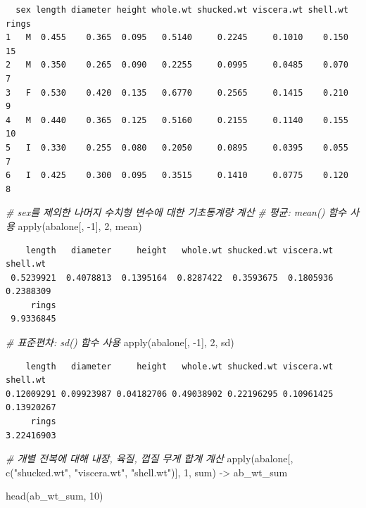 \documentclass[
  11pt,
]{krantz}
\newenvironment{Shaded}{\begin{snugshade}}{\end{snugshade}}
\newcommand{\CommentTok}[1]{\textcolor[rgb]{0.37,0.37,0.37}{\textit{#1}}}
\newcommand{\DecValTok}[1]{\textcolor[rgb]{0.06,0.06,0.06}{#1}}
\newcommand{\FunctionTok}[1]{\textcolor[rgb]{0,0,0}{#1}}
\newcommand{\NormalTok}[1]{#1}
\newcommand{\OtherTok}[1]{\textcolor[rgb]{0.37,0.37,0.37}{#1}}
\newcommand{\SpecialCharTok}[1]{\textcolor[rgb]{0,0,0}{#1}}
\newcommand{\StringTok}[1]{\textcolor[rgb]{0.5,0.5,0.5}{#1}}
\begin{document}
\begin{verbatim}
  sex length diameter height whole.wt shucked.wt viscera.wt shell.wt rings
1   M  0.455    0.365  0.095   0.5140     0.2245     0.1010    0.150    15
2   M  0.350    0.265  0.090   0.2255     0.0995     0.0485    0.070     7
3   F  0.530    0.420  0.135   0.6770     0.2565     0.1415    0.210     9
4   M  0.440    0.365  0.125   0.5160     0.2155     0.1140    0.155    10
5   I  0.330    0.255  0.080   0.2050     0.0895     0.0395    0.055     7
6   I  0.425    0.300  0.095   0.3515     0.1410     0.0775    0.120     8
\end{verbatim}

\begin{Shaded}
\begin{Highlighting}[]
\CommentTok{\# sex를 제외한 나머지 수치형 변수에 대한 기초통계량  계산}
\CommentTok{\# 평균: mean() 함수 사용}
\FunctionTok{apply}\NormalTok{(abalone[, }\SpecialCharTok{{-}}\DecValTok{1}\NormalTok{], }\DecValTok{2}\NormalTok{, mean)}
\end{Highlighting}
\end{Shaded}

\begin{verbatim}
    length   diameter     height   whole.wt shucked.wt viscera.wt   shell.wt 
 0.5239921  0.4078813  0.1395164  0.8287422  0.3593675  0.1805936  0.2388309 
     rings 
 9.9336845 
\end{verbatim}

\begin{Shaded}
\begin{Highlighting}[]
\CommentTok{\# 표준편차: sd() 함수 사용}
\FunctionTok{apply}\NormalTok{(abalone[, }\SpecialCharTok{{-}}\DecValTok{1}\NormalTok{], }\DecValTok{2}\NormalTok{, sd)}
\end{Highlighting}
\end{Shaded}

\begin{verbatim}
    length   diameter     height   whole.wt shucked.wt viscera.wt   shell.wt 
0.12009291 0.09923987 0.04182706 0.49038902 0.22196295 0.10961425 0.13920267 
     rings 
3.22416903 
\end{verbatim}

\begin{Shaded}
\begin{Highlighting}[]
\CommentTok{\# 개별 전복에 대해 내장, 육질, 껍질 무게 합계 계산}
\FunctionTok{apply}\NormalTok{(abalone[, }\FunctionTok{c}\NormalTok{(}\StringTok{"shucked.wt"}\NormalTok{, }
                  \StringTok{"viscera.wt"}\NormalTok{, }
                  \StringTok{"shell.wt"}\NormalTok{)], }\DecValTok{1}\NormalTok{, }
\NormalTok{      sum) }\OtherTok{{-}\textgreater{}}\NormalTok{ ab\_wt\_sum}

\FunctionTok{head}\NormalTok{(ab\_wt\_sum, }\DecValTok{10}\NormalTok{)}
\end{Highlighting}
\end{Shaded}
\end{document}
